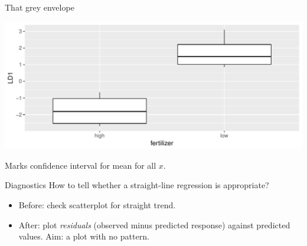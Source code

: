 \begin{frame}[fragile]{That grey envelope}
  
\begin{knitrout}
\color{fgcolor}\begin{kframe}
\begin{alltt}
\hlkwb{=}\hlstd{(}\hlopt{+}\hlstd{()}\hlopt{+}
  \hlstd{(}\hlstd{=}\hlstd{)}\hlopt{+}
  \hlstd{(}\hlstd{=}\hlstd{(}\hlstd{,}\hlstd{,}
\end{alltt}
\end{kframe}
\includegraphics[width=\maxwidth]{figure/unnamed-chunk-8-1} 

\end{knitrout}

Marks confidence interval for mean for all $x$.
  
\end{frame}

\begin{frame}[fragile]{Diagnostics}
How to tell whether a straight-line regression is appropriate?

\vspace{3ex}

\begin{itemize}
\item Before: check scatterplot for straight trend.
\item After: plot {\em residuals} (observed minus predicted response) against predicted values. Aim: a plot with no pattern.
\end{itemize}

\vspace{3ex}


\end{frame}

